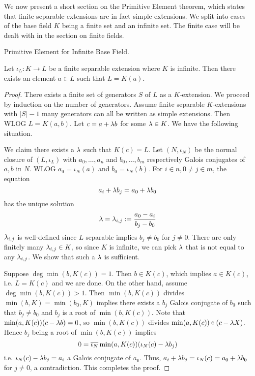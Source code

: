 \documentclass[../book.tex]{subfiles}
\begin{document}
We now present a short section on the Primitive Element theorem,
which states that finite separable extensions are in fact simple extensions.
We split into cases of the base field $K$ being a finite set and an infinite set. 
The finite case will be dealt with in the section on finite fields. 

\begin{thm} Primitive Element for Infinite Base Field.
    
    Let $\iota_L : K \to L$ be a finite separable extension where $K$ is infinite. 
    Then there exists an element $a \in L$ such that $L = K(a)$. 
\end{thm}
\begin{proof}
    
    There exists a finite set of generators $S$ of $L$ as a $K$-extension.
    We proceed by induction on the number of generators. 
    Assume finite separable $K$-extensions with $|S|-1$ many generators 
    can all be written as simple extensions. 
    Then WLOG $L = K(a, b)$. 
    Let $c = a + \lambda b$ for some $\lambda \in K$. 
    We have the following situation. 
    \begin{figure}[H]
        \centering
    \end{figure}
    We claim there exists a $\lambda$ such that $K(c) = L$. 
    Let $(N,\iota_N)$ be the normal closure of $(L,\iota_L)$
    with $a_0,\dots,a_n$ and $b_0,\dots,b_m$ respectively Galois conjugates of $a, b$ in $N$.
    WLOG $a_0 = \iota_N(a)$ and $b_0 = \iota_N(b)$.
    For $i \in n, 0 \neq j \in m$, the equation \[
        a_i + \lambda b_j = a_0 + \lambda b_0
    \]
    has the unique solution \[
        \lambda = \lambda_{i,j} := \frac{a_0 - a_i}{b_j - b_0}
    \]
    $\lambda_{i,j}$ is well-defined since $L$ separable implies $b_j \neq b_0$ for $j\neq0$.
    There are only finitely many $\lambda_{i,j} \in K$, so since $K$ is infinite, 
    we can pick $\lambda$ that is not equal to any $\lambda_{i,j}$. 
    We show that such a $\lambda$ is sufficient.
    
    Suppose $\deg\min(b,K(c)) = 1$. 
    Then $b \in K(c)$, which implies $a \in K(c)$, i.e. $L = K(c)$ and we are done. 
    On the other hand, assume $\deg\min(b,K(c)) > 1$. 
    Then $\min(b,K(c))$ divides $\min(b,K) = \min(b_0,K)$ implies
    there exists a $b_j$ Galois conjugate of $b_0$ such that 
    $b_j \neq b_0$ and $b_j$ is a root of $\min(b,K(c))$. 
    Note that $\min(a,K(c)) (c - \lambda b) = 0$,
    so $\min(b,K(c))$ divides $\min(a,K(c)) \circ (c - \lambda X)$.
    Hence $b_j$ being a root of $\min(b,K(c))$ implies
    \[ 0 = \overline{\iota_N} \min(a,K(c)) (\iota_N(c) - \lambda b_j) \]
    i.e. $\iota_N(c) - \lambda b_j = a_i$ a Galois conjugate of $a_0$.
    Thus, $a_i + \lambda b_j = \iota_N(c) = a_0 + \lambda b_0$ for $j \neq 0$, a contradiction. 
    This completes the proof. 
    
\end{proof}
\end{document}
